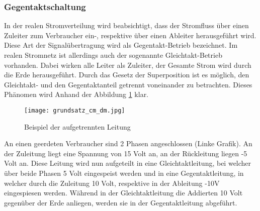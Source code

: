 \subsubsection{Gegentaktschaltung} \label{subsec:gegentakt}

In der realen Stromverteilung wird beabsichtigt, dass der Stromfluss über einen Zuleiter zum Verbraucher ein-, respektive über einen Ableiter herausgeführt wird. 
Diese Art der Signalübertragung wird als Gegentakt-Betrieb bezeichnet. Im realen Stromnetz ist allerdings auch der sogenannte Gleichtakt-Betrieb vorhanden. Dabei wirken alle Leiter als Zuleiter, der Gesamte Strom wird durch die Erde herausgeführt. Durch das Gesetz der Superposition ist es möglich, den Gleichtakt- und den Gegentaktanteil getrennt voneinander zu betrachten. Dieses Phänomen wird Anhand der Abbildung \ref{fig:auftrennen_der_leitung} klar. 

\begin{figure}[H]
	\centering
	\texttt{[image: grundsatz\_cm\_dm.jpg]}
	\caption{Beispiel der aufgetrennten Leitung}
	\label{fig:auftrennen_der_leitung}
\end{figure} 

An einen geerdeten Verbraucher sind 2 Phasen angeschlossen (Linke Grafik). An der Zuleitung liegt eine Spannung von 15 Volt an, an der Rückleitung liegen -5 Volt an. Diese Leitung wird nun aufgeteilt in eine Gleichtaktleitung, bei welcher über beide Phasen 5 Volt eingespeist werden und in eine Gegentaktleitung, in welcher durch die Zuleitung 10 Volt, respektive in der Ableitung -10V eingespiesen werden. Während in der Gleichtaktleitung die Addierten 10 Volt gegenüber der Erde anliegen, werden sie in der Gegentaktleitung abgeführt.
 
 
